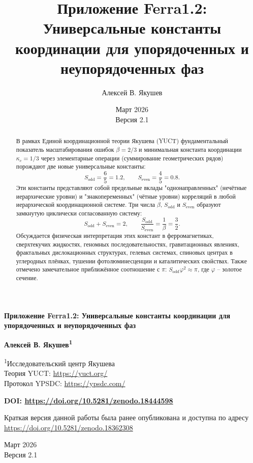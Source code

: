 \documentclass[12pt,a4paper]{article}
\title{Приложение Ferra1.2: Универсальные константы координации для упорядоченных и неупорядоченных фаз}
\author{Алексей В. Якушев}
\date{Март 2026 \\ Версия 2.1}
\begin{document}
	
	\begin{titlepage}
		\begin{center}
			\vspace*{1cm}
			\Huge\textbf{Приложение Ferra1.2: Универсальные константы координации для упорядоченных и неупорядоченных фаз}
			\vspace{1cm}
			
			\Large\textbf{Алексей В. Якушев\textsuperscript{1}}
			\vspace{0.5cm}
			
			\large
			\textsuperscript{1}Исследовательский центр Якушева \\
			Теория YUCT: \url{https://yuct.org/} \\
			Протокол YPSDC: \url{https://ypsdc.com/}
			\vspace{1cm}
			
			\textbf{DOI: \url{https://doi.org/10.5281/zenodo.18444598}}
			\vspace{1cm}
			
			\large
			Краткая версия данной работы была ранее опубликована и доступна по адресу \\
			\url{https://doi.org/10.5281/zenodo.18362308}
			\vspace{1cm}
			
			\large
			Март 2026 \\ \large Версия 2.1
			\vspace{1cm}
			
			\begin{minipage}{0.9\textwidth}
				\begin{abstract}
					\noindent
					В рамках Единой координационной теории Якушева (YUCT) фундаментальный показатель масштабирования ошибок \(\beta = 2/3\) и минимальная константа координации \(\kappa_c = 1/3\) через элементарные операции (суммирование геометрических рядов) порождают две новые универсальные константы:
					\[
					S_{\text{odd}} = \frac{6}{5}=1.2,\qquad S_{\text{even}} = \frac{4}{5}=0.8.
					\]
					Эти константы представляют собой предельные вклады "однонаправленных" (нечётные иерархические уровни) и "знакопеременных" (чётные уровни) корреляций в любой иерархической координационной системе. Три числа \(\beta\), \(S_{\text{odd}}\) и \(S_{\text{even}}\) образуют замкнутую циклически согласованную систему:
					\[
					S_{\text{odd}}+S_{\text{even}} = 2,\qquad \frac{S_{\text{odd}}}{S_{\text{even}}} = \frac{1}{\beta} = \frac{3}{2}.
					\]
					Обсуждается физическая интерпретация этих констант в ферромагнетиках, сверхтекучих жидкостях, геномных последовательностях, гравитационных явлениях, фрактальных дислокационных структурах, гелевых системах, спиновых центрах в углеродных плёнках, тушении фотолюминесценции и каталитических свойствах. Также отмечено замечательное приближённое соотношение с \(\pi\): \(S_{\text{odd}}\varphi^2 \approx \pi\), где \(\varphi\) -- золотое сечение. 
					

\end{abstract}
\end{minipage}
\end{center}
\end{titlepage}
\end{document}
